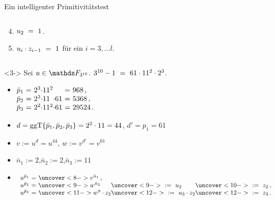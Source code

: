 \documentclass{vorlage}
\begin{document}
\begin{frame}{Ein intelligenter Primitivitätstest}
\begin{minipage}[t]{0.57\textwidth}
\begin{lemma}
\begin{columns}
\begin{column}{0.5\textwidth}
\begin{enumerate}
      \setcounter{enumi}{3}
      \item<14-> $u_2 \ =\  1$.
      \item<14-> $u_i\cdot z_{i-1} \ =\  1$ für ein $i=3,\ldots l$.
    \end{enumerate}
    \end{column}
    \end{columns}
  \end{lemma}
  \end{minipage}\hfill
  \begin{minipage}[t]{0.40\textwidth}
    \begin{beispiel}<3->\small
      Sei $u \in \F_{3^{10}}$. $ 3^{10}-1 \ =\  61 \cdot 11^{2} \cdot 2^{3}$.
      \begin{itemize}
      \item<3->$ \hspace{-5pt}\begin{array}[t]{l@{\ =\ }l@{}l@{}l@{\ =\ }l}
        \bar p_1 & 2^3 \cdot & 11^2 && 968\,, \\
        \bar p_2 & 2^3 \cdot & 11 & \cdot 61 & 5368\,,\\
        \bar p_3 & 2^2 \cdot & 11^2 & \cdot 61 & 29524\,.
        \end{array}$
      \item<4-> $d = \operatorname{ggT}\{ \bar p_1,\bar p_2,\bar p_3\} 
        = 2^2\cdot 11 = 44$,
        $d' = p_1 = 61$
      \item<5-> $v := u^d = u^{44}$,\quad
          $w := v^{d'} = v^{61}$ 
      \item<6-> $\bar n_1 := 2$,\quad $\bar n_2 := 2$,\quad $\bar n_3 := 11$
      \item<7-> \hspace{-5pt}$\begin{array}[t]{l@{\ =\ }l@{}l@{}l}
          u^{\bar p_1} & \uncover<8->{v^{\bar n_1}\,,} \\
          u^{\bar p_2} & \uncover<9->{w^{\bar n_2}}
            &\uncover<9->{\speq{:=} u_2}
            &\uncover<10->{\speq{:=} z_2\,,} \\
          u^{\bar p_3} & \uncover<11->{w^9 \cdot z_2}
            & \uncover<12->{\speq{:=} u_3\cdot z_2}
            & \uncover<12->{\speq{:=} z_3 \,.}
        \end{array}$
      \end{itemize}
    \end{beispiel}
  \end{minipage}
\end{frame}
\end{document}
